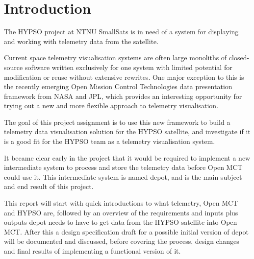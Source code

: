 \begin{comment}
Background
 - Smallsats
 - Mission planning and execution
 - Current telemetry display solutions
   - Large custom-made software suites, single-purpose - large time requirements for implementation and change

Motivation
 - NTNU SmallSat/HYPSO
 - Spacecraft telemetry
 - How should one display and process telemetry?
 - Why Open MCT works for this
   - Open framework, used by NASA on multiple projects; one of the few frameworks of its type that’s available to the public
   -Wanted to implement a well-documented and expandable solution for this; Open MCT has few existing implementations, as it is a fairly new framework - largely minor modifications of the tutorial
\end{comment}

\section{Introduction}

The HYPSO project at NTNU SmallSats is in need of a system for displaying and working with telemetry data from the satellite.

Current space telemetry visualisation systems are often large monoliths of closed-source software written exclusively for one system with limited potential for modification or reuse without extensive rewrites. One major exception to this is the recently emerging Open Mission Control Technologies data presentation framework from NASA and JPL, which provides an interesting opportunity for trying out a new and more flexible approach to telemetry visualisation.

The goal of this project assignment is to use this new framework to build a telemetry data visualisation solution for the HYPSO satellite, and investigate if it is a good fit for the HYPSO team as a telemetry visualisation system.

It became clear early in the project that it would be required to implement a new intermediate system to process and store the telemetry data before Open MCT could use it. This intermediate system is named \Gls{depot}, and is the main subject and end result of this project.

This report will start with quick introductions to what telemetry, Open MCT and HYPSO are, followed by an overview of the requirements and inputs plus outputs \Gls{depot} needs to have to get data from the HYPSO satellite into Open MCT. After this a design specification draft for a possible initial version of \Gls{depot} will be documented and discussed, before covering the process, design changes and final results of implementing a functional version of it.

